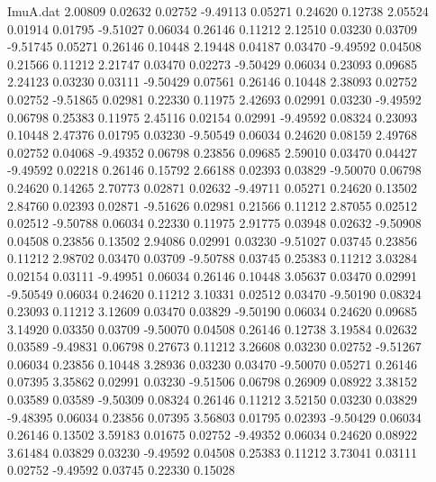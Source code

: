 \begin{filecontents}{ImuA.dat}
   2.00809    0.02632    0.02752   -9.49113    0.05271    0.24620    0.12738
   2.05524    0.01914    0.01795   -9.51027    0.06034    0.26146    0.11212
   2.12510    0.03230    0.03709   -9.51745    0.05271    0.26146    0.10448
   2.19448    0.04187    0.03470   -9.49592    0.04508    0.21566    0.11212
   2.21747    0.03470    0.02273   -9.50429    0.06034    0.23093    0.09685
   2.24123    0.03230    0.03111   -9.50429    0.07561    0.26146    0.10448
   2.38093    0.02752    0.02752   -9.51865    0.02981    0.22330    0.11975
   2.42693    0.02991    0.03230   -9.49592    0.06798    0.25383    0.11975
   2.45116    0.02154    0.02991   -9.49592    0.08324    0.23093    0.10448
   2.47376    0.01795    0.03230   -9.50549    0.06034    0.24620    0.08159
   2.49768    0.02752    0.04068   -9.49352    0.06798    0.23856    0.09685
   2.59010    0.03470    0.04427   -9.49592    0.02218    0.26146    0.15792
   2.66188    0.02393    0.03829   -9.50070    0.06798    0.24620    0.14265
   2.70773    0.02871    0.02632   -9.49711    0.05271    0.24620    0.13502
   2.84760    0.02393    0.02871   -9.51626    0.02981    0.21566    0.11212
   2.87055    0.02512    0.02512   -9.50788    0.06034    0.22330    0.11975
   2.91775    0.03948    0.02632   -9.50908    0.04508    0.23856    0.13502
   2.94086    0.02991    0.03230   -9.51027    0.03745    0.23856    0.11212
   2.98702    0.03470    0.03709   -9.50788    0.03745    0.25383    0.11212
   3.03284    0.02154    0.03111   -9.49951    0.06034    0.26146    0.10448
   3.05637    0.03470    0.02991   -9.50549    0.06034    0.24620    0.11212
   3.10331    0.02512    0.03470   -9.50190    0.08324    0.23093    0.11212
   3.12609    0.03470    0.03829   -9.50190    0.06034    0.24620    0.09685
   3.14920    0.03350    0.03709   -9.50070    0.04508    0.26146    0.12738
   3.19584    0.02632    0.03589   -9.49831    0.06798    0.27673    0.11212
   3.26608    0.03230    0.02752   -9.51267    0.06034    0.23856    0.10448
   3.28936    0.03230    0.03470   -9.50070    0.05271    0.26146    0.07395
   3.35862    0.02991    0.03230   -9.51506    0.06798    0.26909    0.08922
   3.38152    0.03589    0.03589   -9.50309    0.08324    0.26146    0.11212
   3.52150    0.03230    0.03829   -9.48395    0.06034    0.23856    0.07395
   3.56803    0.01795    0.02393   -9.50429    0.06034    0.26146    0.13502
   3.59183    0.01675    0.02752   -9.49352    0.06034    0.24620    0.08922
   3.61484    0.03829    0.03230   -9.49592    0.04508    0.25383    0.11212
   3.73041    0.03111    0.02752   -9.49592    0.03745    0.22330    0.15028

\end{filecontents}
